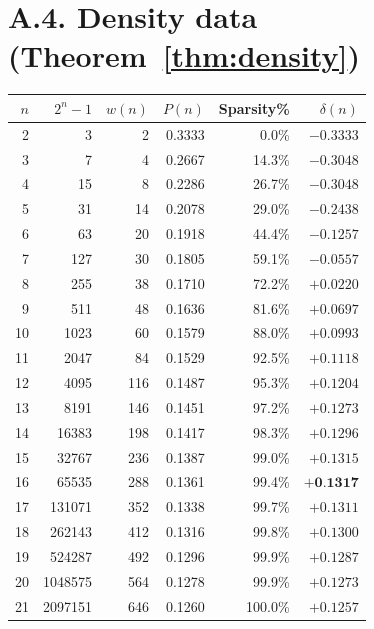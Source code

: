 \newpage
\section*{A.4. Density data (Theorem~\ref{thm:density})}
\label{subsec:a4-density}

\begin{table}[H]
\centering
\small
\begin{tabular}{r|rrrrr}
\toprule
$n$ & $2^n-1$ & $w(n)$ & $P(n)$ & Sparsity\% & $\delta(n)$ \\
\midrule
 2 &          3 &    2 & 0{.}3333 &  0{.}0\% & $-0{.}3333$ \\
 3 &          7 &    4 & 0{.}2667 & 14{.}3\% & $-0{.}3048$ \\
 4 &         15 &    8 & 0{.}2286 & 26{.}7\% & $-0{.}3048$ \\
 5 &         31 &   14 & 0{.}2078 & 29{.}0\% & $-0{.}2438$ \\
 6 &         63 &   20 & 0{.}1918 & 44{.}4\% & $-0{.}1257$ \\
 7 &        127 &   30 & 0{.}1805 & 59{.}1\% & $-0{.}0557$ \\
 8 &        255 &   38 & 0{.}1710 & 72{.}2\% & $+0{.}0220$ \\
 9 &        511 &   48 & 0{.}1636 & 81{.}6\% & $+0{.}0697$ \\
10 &       1023 &   60 & 0{.}1579 & 88{.}0\% & $+0{.}0993$ \\
11 &       2047 &   84 & 0{.}1529 & 92{.}5\% & $+0{.}1118$ \\
12 &       4095 &  116 & 0{.}1487 & 95{.}3\% & $+0{.}1204$ \\
13 &       8191 &  146 & 0{.}1451 & 97{.}2\% & $+0{.}1273$ \\
14 &      16383 &  198 & 0{.}1417 & 98{.}3\% & $+0{.}1296$ \\
15 &      32767 &  236 & 0{.}1387 & 99{.}0\% & $+0{.}1315$ \\
16 &      65535 &  288 & 0{.}1361 & 99{.}4\% & $\mathbf{+0{.}1317}$ \\
17 &     131071 &  352 & 0{.}1338 & 99{.}7\% & $+0{.}1311$ \\
18 &     262143 &  412 & 0{.}1316 & 99{.}8\% & $+0{.}1300$ \\
19 &     524287 &  492 & 0{.}1296 & 99{.}9\% & $+0{.}1287$ \\
20 &    1048575 &  564 & 0{.}1278 & 99{.}9\% & $+0{.}1273$ \\
21 &    2097151 &  646 & 0{.}1260 &100{.}0\% & $+0{.}1257$ \\

\end{tabular}
\end{table}

